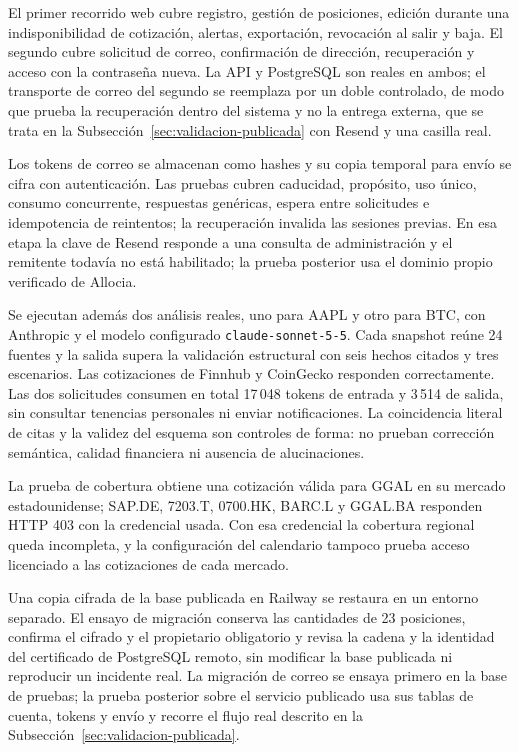 El primer recorrido web cubre registro, gestión de posiciones, edición durante una indisponibilidad de cotización, alertas, exportación, revocación al salir y baja. El segundo cubre solicitud de correo, confirmación de dirección, recuperación y acceso con la contraseña nueva. La API y PostgreSQL son reales en ambos; el transporte de correo del segundo se reemplaza por un doble controlado, de modo que prueba la recuperación dentro del sistema y no la entrega externa, que se trata en la Subsección~\ref{sec:validacion-publicada} con Resend y una casilla real.

Los tokens de correo se almacenan como hashes y su copia temporal para envío se cifra con autenticación. Las pruebas cubren caducidad, propósito, uso único, consumo concurrente, respuestas genéricas, espera entre solicitudes e idempotencia de reintentos; la recuperación invalida las sesiones previas. En esa etapa la clave de Resend responde a una consulta de administración y el remitente todavía no está habilitado; la prueba posterior usa el dominio propio verificado de Allocia.

Se ejecutan además dos análisis reales, uno para AAPL y otro para BTC, con Anthropic y el modelo configurado \texttt{claude-sonnet-5-5}. Cada snapshot reúne 24 fuentes y la salida supera la validación estructural con seis hechos citados y tres escenarios. Las cotizaciones de Finnhub y CoinGecko responden correctamente. Las dos solicitudes consumen en total 17\,048 tokens de entrada y 3\,514 de salida, sin consultar tenencias personales ni enviar notificaciones. La coincidencia literal de citas y la validez del esquema son controles de forma: no prueban corrección semántica, calidad financiera ni ausencia de alucinaciones.

La prueba de cobertura obtiene una cotización válida para GGAL en su mercado estadounidense; SAP.DE, 7203.T, 0700.HK, BARC.L y GGAL.BA responden HTTP 403 con la credencial usada. Con esa credencial la cobertura regional queda incompleta, y la configuración del calendario tampoco prueba acceso licenciado a las cotizaciones de cada mercado.

Una copia cifrada de la base publicada en Railway se restaura en un entorno separado. El ensayo de migración conserva las cantidades de 23 posiciones, confirma el cifrado y el propietario obligatorio y revisa la cadena y la identidad del certificado de PostgreSQL remoto, sin modificar la base publicada ni reproducir un incidente real. La migración de correo se ensaya primero en la base de pruebas; la prueba posterior sobre el servicio publicado usa sus tablas de cuenta, tokens y envío y recorre el flujo real descrito en la Subsección~\ref{sec:validacion-publicada}.

